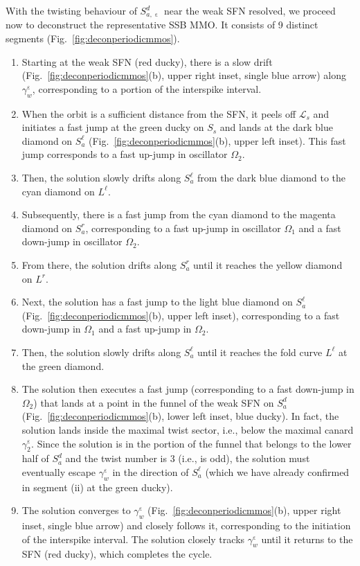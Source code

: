 \documentclass[10pt,onecolumn]{article}
\theoremstyle{plain}
\DeclareMathOperator{\eps}{\varepsilon}
\begin{document}
With the twisting behaviour of $S_{a,\eps}^d$ near the weak SFN resolved, we proceed now to deconstruct the representative SSB MMO. It consists of 9 distinct segments (Fig.~\ref{fig:deconperiodicmmos}).
\begin{enumerate}[label=(\roman*)]
\setlength{\itemsep}{0pt}
\item Starting at the weak SFN (red ducky), there is a slow drift (Fig.~\ref{fig:deconperiodicmmos}(b), upper right inset, single blue arrow) along $\gamma_w^{\eps}$, corresponding to a portion of the interspike interval. 
\item When the orbit is a sufficient distance from the SFN, it peels off $\mathcal L_s$ and initiates a fast jump at the green ducky on $S_s$ and lands at the dark blue diamond on $S_a^{\ell}$ (Fig.~\ref{fig:deconperiodicmmos}(b), upper left inset). This fast jump corresponds to a fast up-jump in oscillator $\Omega_2$.
\item Then, the solution slowly drifts along $S_a^{\ell}$ from the dark blue diamond to the cyan diamond on $L^{\ell}$.  
\item Subsequently, there is a fast jump from the cyan diamond to the magenta diamond on $S_a^r$, corresponding to a fast up-jump in oscillator $\Omega_1$ and a fast down-jump in oscillator $\Omega_2$. 
\item From there, the solution drifts along $S_a^r$ until it reaches the yellow diamond on $L^r$. 
\item Next, the solution has a fast jump to the light blue diamond on $S_a^{\ell}$ (Fig.~\ref{fig:deconperiodicmmos}(b), upper left inset), corresponding to a fast down-jump in $\Omega_1$ and a fast up-jump in $\Omega_2$.
\item Then, the solution slowly drifts along $S_a^{\ell}$ until it reaches the fold curve $L^{\ell}$ at the green diamond. 
\item The solution then executes a fast jump (corresponding to a fast down-jump in $\Omega_2$) that lands at a point in the funnel of the weak SFN on $S_a^d$ (Fig.~\ref{fig:deconperiodicmmos}(b), lower left inset, blue ducky). In fact, the solution lands inside the maximal twist sector, i.e., below the maximal canard $\gamma_2^{\eps}$. Since the solution is in the portion of the funnel that belongs to the lower half of $S_a^d$ and the twist number is 3 (i.e., is odd), the solution must eventually escape $\gamma_w^{\eps}$ in the direction of $S_a^{\ell}$ (which we have already confirmed in segment (ii) at the green ducky).  
\item The solution converges to $\gamma_w^{\eps}$ (Fig.~\ref{fig:deconperiodicmmos}(b), upper right inset, single blue arrow) and closely follows it, corresponding to the initiation of the interspike interval. The solution closely tracks $\gamma_w^{\eps}$ until it returns to the SFN (red ducky), which completes the cycle. 
\end{enumerate}
\end{document}
